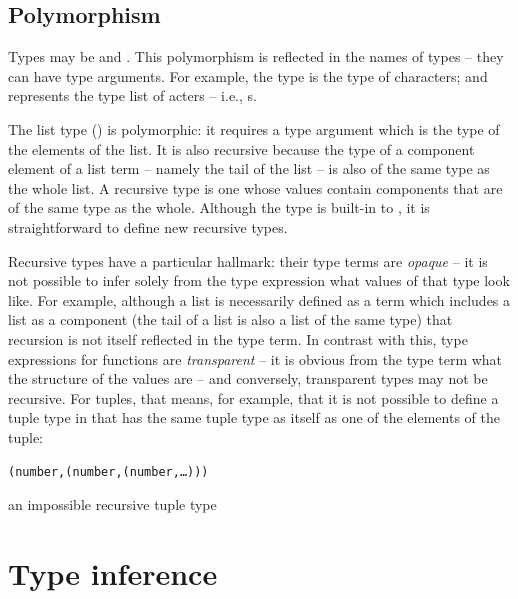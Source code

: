 \subsection{Polymorphism}
Types  may be  and . This polymorphism is reflected in the names of types -- they can have type arguments. For example, the  type is the type of characters; and  represents the type list  of acters -- i.e., s.

The list type () is polymorphic: it requires a type argument which is the type of the elements of the list. It is also recursive because the type of a component element of a list term -- namely the tail of the list -- is also of the same type as the whole list.  A recursive type is one whose values contain components that are of the same type as the whole. Although the  type is built-in to \go, it is straightforward to define new recursive types. 

Recursive types have a particular hallmark: their type terms are \emph{opaque} -- it is not possible to infer solely from the type expression what values of that type look like. For example, although a list is necessarily defined as a term which includes a list as a component (the tail of a list is also a list of the same type) that recursion is not itself reflected in the  type term. In contrast with this, type expressions for functions are \emph{transparent} -- it is obvious from the type term what the structure of the values are -- and conversely, transparent types may not be recursive. For tuples, that means, for example, that it is not possible to define a tuple type in \go that has the same tuple type as itself as one of the elements of the tuple:
\begin{example}
\begin{boxed}
\begin{alltt}
( number, ( number, ( number, \ldots)))
\end{alltt}
\end{boxed}
\caption{\label{recursive:tuple}an impossible recursive tuple type}
\end{example}

\section{Type inference}
\label{type:inference}

